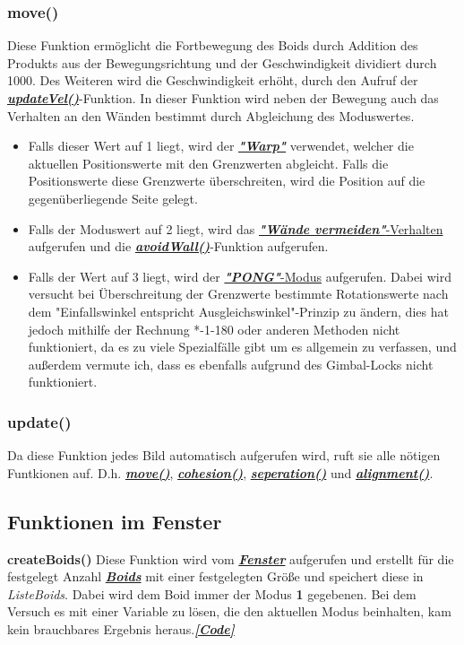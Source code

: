 \documentclass[a4paper, hidelinks, 12pt]{article}
\begin{document}
\normalsize\subsubsection{move()}\label{Umsetzungmove}
Diese Funktion ermöglicht die Fortbewegung des Boids durch Addition des Produkts aus der Bewegungsrichtung und der Geschwindigkeit dividiert durch 1000. Des Weiteren wird die Geschwindigkeit erhöht, durch den Aufruf der \hyperref[UmsetzungupdateVel]{\textbf{\emph{updateVel()}}}-Funktion.
In dieser Funktion wird neben der Bewegung auch das Verhalten an den Wänden bestimmt durch Abgleichung des Moduswertes.\newline
\begin{itemize}
\item Falls dieser Wert auf 1 liegt, wird der \hyperref[IdeeWarp]{\textbf{\emph{"Warp"}}} verwendet, welcher die aktuellen Positionswerte mit den Grenzwerten abgleicht. Falls die Positionswerte diese Grenzwerte überschreiten, wird die Position auf die gegenüberliegende Seite gelegt.
\item Falls der Moduswert auf 2 liegt, wird das \hyperref[IdeeAvoidWall]{\textbf{\emph{"Wände vermeiden"}}-Verhalten} aufgerufen und die \hyperref[UmsetzungavoidWall]{\textbf{\emph{avoidWall()}}}-Funktion aufgerufen.
\item Falls der Wert auf 3 liegt, wird der \hyperref[IdeePong]{\textbf{\emph{"PONG"}}-Modus} aufgerufen. Dabei wird versucht bei Überschreitung der Grenzwerte bestimmte Rotationswerte nach dem "Einfallswinkel entspricht Ausgleichswinkel"-Prinzip zu ändern, dies hat jedoch mithilfe der Rechnung *-1-180 oder anderen Methoden\cite{Space2022} nicht funktioniert, da es zu viele Spezialfälle gibt um es allgemein zu verfassen, und außerdem vermute ich, dass es ebenfalls aufgrund des Gimbal-Locks\cite{2022o} nicht funktioniert.
\end{itemize}
		
\subsubsection{update()}\label{Umsetzungupdate}
Da diese Funktion jedes Bild automatisch aufgerufen wird\cite{update}, ruft sie alle nötigen Funtkionen auf. D.h. \hyperref[Umsetzungmove]{\textbf{\emph{move()}}}, \hyperref[Umsetzungcohesion]{\textbf{\emph{cohesion()}}}, \hyperref[Umsetzungseperation]{\textbf{\emph{seperation()}}} und \hyperref[Umsetzungalignment]{\textbf{\emph{alignment()}}}.
			
\subsection{Funktionen im Fenster}
\textbf{createBoids()}\label{UmsetzungcreateBoids}
Diese Funktion wird vom \hyperref[UmsetzungFenster]{\textbf{\emph{Fenster}}} aufgerufen und erstellt für die festgelegt Anzahl \hyperref[UmsetzungBoid]{\textbf{\emph{Boids}}} mit einer festgelegten Größe und speichert diese in \emph{Liste\textunderscore Boids}. Dabei wird dem Boid immer der Modus \textbf{1} gegebenen. Bei dem Versuch es mit einer Variable zu lösen, die den aktuellen Modus beinhalten, kam kein brauchbares Ergebnis heraus.\hyperref[CodecreateBoids]{\textbf{\emph{[Code]}}}
			
\end{document}
